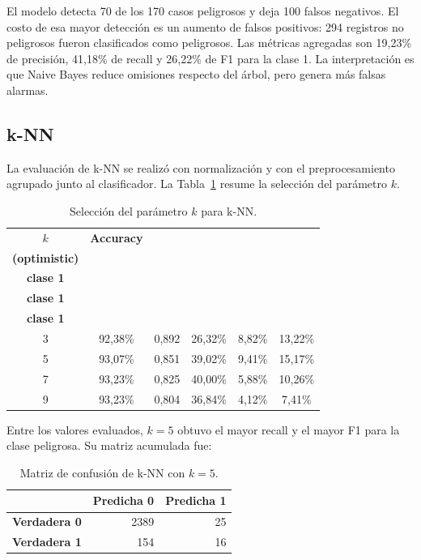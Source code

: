 \documentclass[12pt,a4paper]{article}
\begin{document}
El modelo detecta 70 de los 170 casos peligrosos y deja 100 falsos negativos. El costo de esa mayor detección es un aumento de falsos positivos: 294 registros no peligrosos fueron clasificados como peligrosos. Las métricas agregadas son 19,23\% de precisión, 41,18\% de recall y 26,22\% de F1 para la clase 1. La interpretación es que Naive Bayes reduce omisiones respecto del árbol, pero genera más falsas alarmas.

\subsection{k-NN}
La evaluación de k-NN se realizó con normalización y con el preprocesamiento agrupado junto al clasificador. La Tabla~\ref{tab:knn-k-selection} resume la selección del parámetro $k$.

\begin{table}[H]
\centering
\caption{Selección del parámetro $k$ para k-NN.}
\label{tab:knn-k-selection}
\small
\begin{tabular}{@{}c c c c c c@{}}
\toprule
\textbf{$k$} & \textbf{Accuracy} & \shortstack{\textbf{AUC}\\\textbf{(optimistic)}} & \shortstack{\textbf{Precisión}\\\textbf{clase 1}} & \shortstack{\textbf{Recall}\\\textbf{clase 1}} & \shortstack{\textbf{F1}\\\textbf{clase 1}} \\
\midrule
3 & 92,38\% & 0,892 & 26,32\% & 8,82\% & 13,22\% \\
5 & 93,07\% & 0,851 & 39,02\% & 9,41\% & 15,17\% \\
7 & 93,23\% & 0,825 & 40,00\% & 5,88\% & 10,26\% \\
9 & 93,23\% & 0,804 & 36,84\% & 4,12\% & 7,41\% \\
\bottomrule
\end{tabular}
\end{table}

Entre los valores evaluados, $k=5$ obtuvo el mayor recall y el mayor F1 para la clase peligrosa. Su matriz acumulada fue:

\begin{table}[H]
\centering
\caption{Matriz de confusión de k-NN con $k=5$.}
\label{tab:knn-k5-matrix}
\begin{tabular}{lrr}
\toprule
 & \textbf{Predicha 0} & \textbf{Predicha 1} \\
\midrule
\textbf{Verdadera 0} & 2389 & 25 \\
\textbf{Verdadera 1} & 154 & 16 \\
\bottomrule
\end{tabular}
\end{table}
\end{document}
